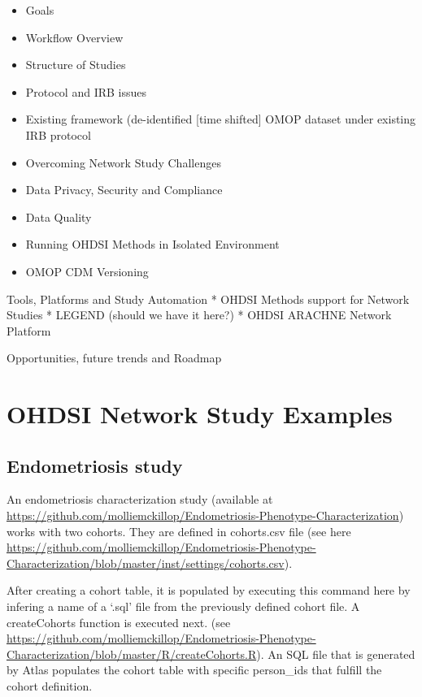 \documentclass[11pt]{book}
\providecommand{\tightlist}{%
  \setlength{\itemsep}{0pt}\setlength{\parskip}{0pt}}
\begin{document}
\begin{itemize}
\tightlist
\item
  Goals
\item
  Workflow Overview
\item
  Structure of Studies
\item
  Protocol and IRB issues
\item
  Existing framework (de-identified {[}time shifted{]} OMOP dataset
  under existing IRB protocol
\item
  Overcoming Network Study Challenges
\item
  Data Privacy, Security and Compliance
\item
  Data Quality
\item
  Running OHDSI Methods in Isolated Environment
\item
  OMOP CDM Versioning
\end{itemize}

Tools, Platforms and Study Automation * OHDSI Methods support for
Network Studies * LEGEND (should we have it here?) * OHDSI ARACHNE
Network Platform

Opportunities, future trends and Roadmap

\section{OHDSI Network Study
Examples}\label{ohdsi-network-study-examples}

\subsection{Endometriosis study}\label{endometriosis-study}

An endometriosis characterization study (available at
\url{https://github.com/molliemckillop/Endometriosis-Phenotype-Characterization})
works with two cohorts. They are defined in cohorts.csv file (see here
\url{https://github.com/molliemckillop/Endometriosis-Phenotype-Characterization/blob/master/inst/settings/cohorts.csv}).

After creating a cohort table, it is populated by executing this command
here by infering a name of a `.sql' file from the previously defined
cohort file. A createCohorts function is executed next. (see
\url{https://github.com/molliemckillop/Endometriosis-Phenotype-Characterization/blob/master/R/createCohorts.R}).
An SQL file that is generated by Atlas populates the cohort table with
specific person\_ids that fulfill the cohort definition.
\end{document}
